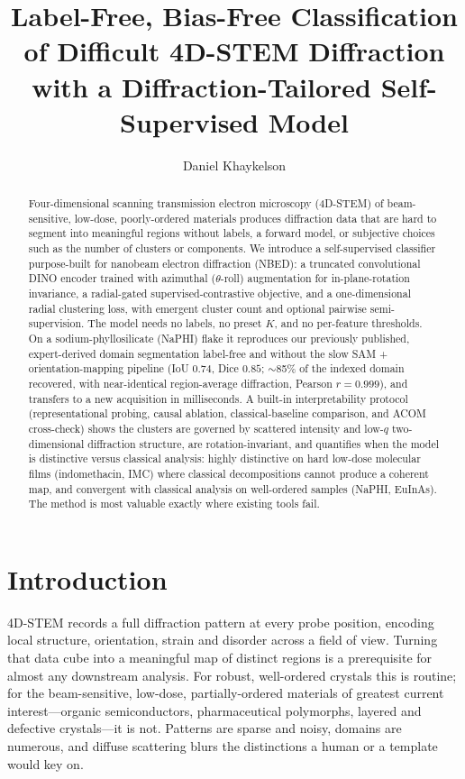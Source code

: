 \documentclass[journal=ancac3,manuscript=article,layout=twocolumn]{achemso}
\author{Daniel Khaykelson}
\affiliation{Department of Materials Science and Engineering, [Institution]}
\title{Label-Free, Bias-Free Classification of Difficult 4D-STEM Diffraction
with a Diffraction-Tailored Self-Supervised Model}
\begin{document}
\begin{abstract}
Four-dimensional scanning transmission electron microscopy (4D-STEM) of
beam-sensitive, low-dose, poorly-ordered materials produces diffraction data
that are hard to segment into meaningful regions without labels, a forward
model, or subjective choices such as the number of clusters or components. We
introduce a self-supervised classifier purpose-built for nanobeam electron
diffraction (NBED): a truncated convolutional DINO encoder trained with
azimuthal ($\theta$-roll) augmentation for in-plane-rotation invariance, a
radial-gated supervised-contrastive objective, and a one-dimensional radial
clustering loss, with emergent cluster count and optional pairwise
semi-supervision. The model needs no labels, no preset $K$, and no
per-feature thresholds. On a sodium-phyllosilicate (NaPHI) flake it reproduces
our previously published, expert-derived domain segmentation label-free and
without the slow SAM + orientation-mapping pipeline (IoU $0.74$, Dice $0.85$;
$\sim$85\% of the indexed domain recovered, with near-identical region-average
diffraction, Pearson $r=0.999$), and transfers to a new
acquisition in milliseconds. A built-in interpretability protocol
(representational probing, causal ablation, classical-baseline comparison, and
ACOM cross-check) shows the clusters are governed by scattered intensity and
low-$q$ two-dimensional diffraction structure, are rotation-invariant, and
quantifies when the model is distinctive versus classical analysis: highly
distinctive on hard low-dose molecular films (indomethacin, IMC) where
classical decompositions cannot produce a coherent map, and convergent with
classical analysis on well-ordered samples (NaPHI, EuInAs). The method is most
valuable exactly where existing tools fail.
\end{abstract}

\section{Introduction}
4D-STEM records a full diffraction pattern at every probe position, encoding
local structure, orientation, strain and disorder across a
field of view.\cite{ophus2019} Turning that data cube into a meaningful map of
distinct regions is a prerequisite for almost any downstream analysis. For
robust, well-ordered crystals this is routine; for the beam-sensitive,
low-dose, partially-ordered materials of greatest current interest---organic
semiconductors, pharmaceutical polymorphs, layered and defective
crystals---it is not. Patterns are sparse and noisy, domains are numerous,
and diffuse scattering blurs the distinctions a human or a template would key
on.
\end{document}
